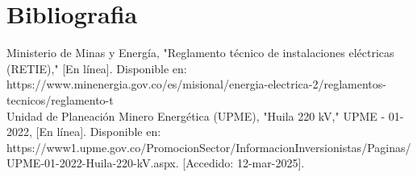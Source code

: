 \documentclass[conference]{IEEEtran}
\theoremstyle{mytheoremstyle}
\theoremstyle{mytheoremstyle}
\theoremstyle{myproblemstyle}
\begin{document}
\section{Bibliografia}
Ministerio de Minas y Energía, "Reglamento técnico de instalaciones eléctricas (RETIE)," [En línea]. Disponible en: https://www.minenergia.gov.co/es/misional/energia-electrica-2/reglamentos-tecnicos/reglamento-t%
\\
Unidad de Planeación Minero Energética (UPME), "Huila 220 kV," UPME - 01-2022, [En línea]. Disponible en: https://www1.upme.gov.co/PromocionSector/InformacionInversionistas/Paginas/UPME-01-2022-Huila-220-kV.aspx. [Accedido: 12-mar-2025].
\end{document}
